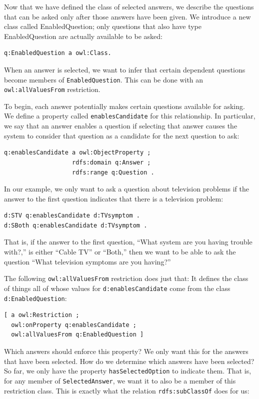 Now that we have defined the class of selected answers, we describe the
questions that can be asked only after those answers have been given. We
introduce a new class called EnabledQuestion; only questions that also
have type EnabledQuestion are actually available to be asked:

\begin{lstlisting}
q:EnabledQuestion a owl:Class.
\end{lstlisting}

When an answer is selected, we want to infer that certain dependent
questions become members of
\texttt{EnabledQuestion}. This can be done with an \texttt{owl:allValuesFrom} restriction.

To begin, each answer potentially makes certain questions available for
asking. We define a property called \texttt{enablesCandidate} for this
relationship. In particular, we say that an answer enables a question if
selecting that answer causes the system to consider that question as a
candidate for the next question to ask:

\begin{lstlisting}
q:enablesCandidate a owl:ObjectProperty ;
                   rdfs:domain q:Answer ;
                   rdfs:range q:Question .
\end{lstlisting}

In our example, we only want to ask a question about television problems
if the answer to the first question indicates that there is a television
problem:

\begin{lstlisting}
d:STV q:enablesCandidate d:TVsymptom .
d:SBoth q:enablesCandidate d:TVsymptom .
\end{lstlisting}

That is, if the answer to the first question, ``What system are you
having trouble with?,'' is either ``Cable TV'' or ``Both,'' then we want
to be able to ask the question ``What television symptoms are you
having?''

The following \texttt{owl:allValuesFrom} restriction does just that: It defines
the class of things all of
whose values for \texttt{d:enablesCandidate} come from the class
\texttt{d:EnabledQuestion}:

\begin{lstlisting}
[ a owl:Restriction ;
  owl:onProperty q:enablesCandidate ;
  owl:allValuesFrom q:EnabledQuestion ]
\end{lstlisting}

Which answers should enforce this property? We only want this for the
answers that have been selected. How do we determine which answers have
been selected? So far, we only have the property \texttt{hasSelectedOption} to
indicate them. That is, for any member of \texttt{SelectedAnswer}, we want it to
also be a member of this restriction class. This is exactly what the
relation \texttt{rdfs:subClassOf} does for us:

